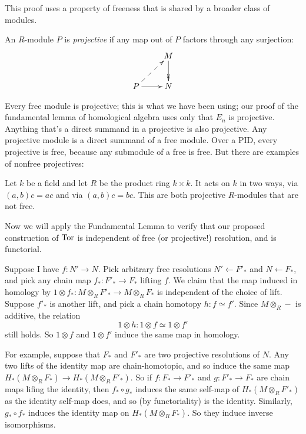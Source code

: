 This proof uses a property of freeness that is shared by a broader class of
modules. 

\begin{definition}
An $R$-module $P$ is {\em projective} if any map out of $P$ factors through 
any surjection:
\begin{equation*}
\xymatrix{ & M\ar@{->>}[d]\\
P\ar@{-->}[ur]\ar[r] & N}
\end{equation*}
\end{definition}
Every free module is projective; this is what we have been using;
our proof of the fundamental lemma of homological algebra uses only that 
$E_n$ is projective. 
Anything that's a direct summand in a projective is also projective. Any projective module is a direct summand of a free module. Over a PID, every projective is free, because any submodule of a free is free. But there are examples of
nonfree projectives: 
\begin{example}
Let $k$ be a field and let $R$ be the product ring $k\times k$. It acts on $k$
in two ways, via $(a,b)c=ac$ and via $(a,b)c=bc$. This are both projective $R$-modules that are not free.
\end{example}

Now we will apply the Fundamental Lemma 
to verify that our proposed construction of 
$\operatorname{Tor}$ is independent of free (or projective!) resolution, and is functorial. 

Suppose I have $f:N'\to N$. Pick arbitrary free resolutions 
$N'\leftarrow F'_*$ and $N\leftarrow F_*$, and pick any chain map 
$f_*:F'_*\to F_*$ lifting $f$. We claim that the map
induced in homology by $1\otimes f_*:M\otimes_RF'_*\to M\otimes_RF_*$
is independent of the choice of lift. Suppose $f'_*$ is another lift,
and pick a chain homotopy $h:f\simeq f'$. Since $M\otimes_R-$ is additive, 
the relation 
\[
1\otimes h:1\otimes f\simeq 1\otimes f'
\] 
still holds. So $1\otimes f$ and $1\otimes f'$ induce the same map in homology.

For example, suppose that $F_*$ and $F'_*$ are two projective resolutions of 
$N$. Any two lifts of the identity map are chain-homotopic, and so induce
the same map $H_*(M\otimes_RF_*)\to H_*(M\otimes_RF'_*)$. So if $f:F_*\to F'_*$
and $g:F'_*\to F_*$ are chain maps lifing the identity, then $f_*\circ g_*$
induces the same self-map of $H_*(M\otimes_RF'_*)$ as the identity self-map 
does, and so (by functoriality) is the identity. Similarly, $g_*\circ f_*$
induces the identity map on $H_*(M\otimes_RF_*)$. So they induce inverse
isomorphisms. 

